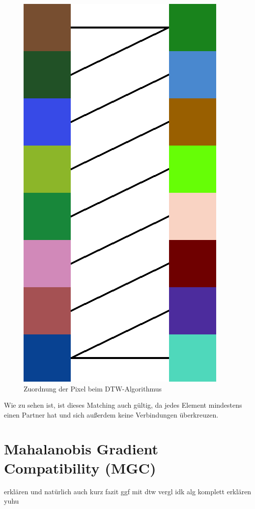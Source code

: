 \documentclass{whswinvcbook}
\begin{document}
\begin{figure}[H]
    \centering
    \includegraphics[width=0.30\linewidth]{img/dtw_ex2.png}
    \caption{Zuordnung der Pixel beim DTW-Algorithmus}
    \label{fig-dtw-ex2}
\end{figure}
Wie zu sehen ist, ist dieses Matching auch gültig, da jedes Element mindestens einen Partner hat und sich außerdem keine Verbindungen überkreuzen.
\section{Mahalanobis Gradient Compatibility (MGC)}
erklären und natürlich auch kurz fazit ggf mit dtw vergl idk alg komplett erklären yuhu

\backmatter

\preparebibliography

\end{document}
